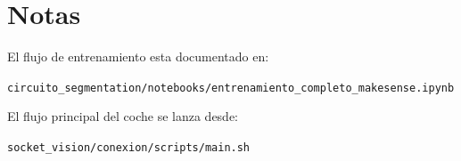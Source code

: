 \documentclass[a4paper,11pt]{article}
\begin{document}
\section*{Notas}

El flujo de entrenamiento esta documentado en:

\begin{center}
\texttt{circuito\_segmentation/notebooks/entrenamiento\_completo\_makesense.ipynb}
\end{center}

El flujo principal del coche se lanza desde:

\begin{center}
\texttt{socket\_vision/conexion/scripts/main.sh}
\end{center}
\end{document}
